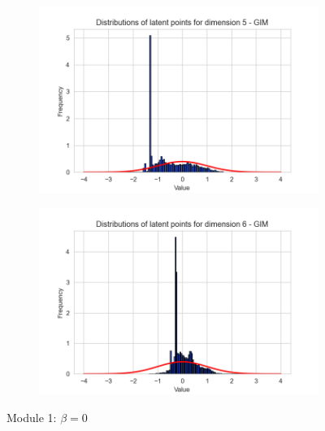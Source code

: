 \begin{figure}[h]
\begin{subfigure}[b]{0.25\textwidth}
	\end{subfigure}
	\hfill
	\begin{subfigure}[b]{0.25\textwidth}
		\centering
		\includegraphics[width=1\linewidth]{"graphs/distr/module1 kld0/_ distribution_latent_space_GIM_dim=4"}
	\end{subfigure}
	\hfill
	\begin{subfigure}[b]{0.25\textwidth}
		\centering
		\includegraphics[width=1\linewidth]{"graphs/distr/module1 kld0/_ distribution_latent_space_GIM_dim=5"}
	\end{subfigure}
	\caption{Module 1: $\beta=0$}
	\label{fig:distr_module1_beta0}
\end{figure}
